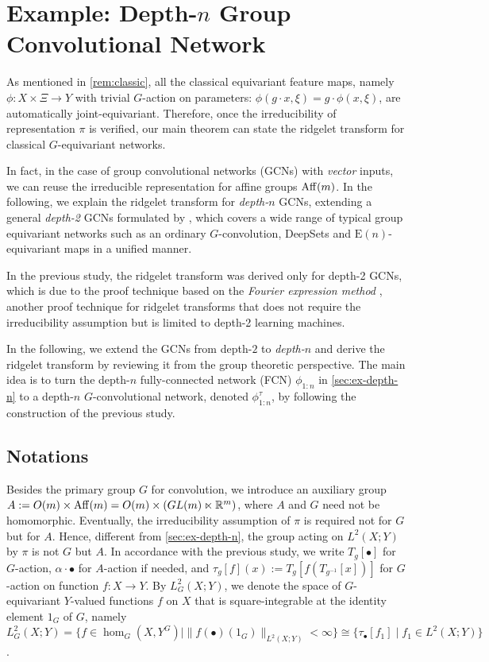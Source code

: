 \section{Example: Depth-$n$ Group Convolutional Network} \label{sec:gconv}
As mentioned in \cref{rem:classic}, all the classical equivariant feature maps, namely $\phi: X \times \Xi \to Y$ with trivial $G$-action on parameters: $\phi( g \cdot x, \xi) = g \cdot \phi(x,\xi)$, are automatically joint-equivariant.
Therefore, once the irreducibility of representation $\pi$ is verified, our main theorem can state the ridgelet transform for classical $G$-equivariant networks.

In fact, in the case of group convolutional networks (GCNs) with \emph{vector} inputs, we can reuse the irreducible representation for affine groups $\operatorname{Aff}(m)$.
In the following, we explain the ridgelet transform for \emph{depth-$n$} GCNs, extending a general \emph{depth-2} GCNs formulated by \citet{Sonoda2022gconv}, which
covers a wide range of typical group equivariant networks such as an ordinary $G$-convolution, DeepSets and $\mathrm{E}(n)$-equivariant maps in a unified manner.

In the previous study, the ridgelet transform was derived only for depth-2 GCNs, which is due to the proof technique based on the \emph{Fourier expression method} \citep[see][for more details]{Sonoda2024fourier}, another proof technique for ridgelet transforms that does not require the irreducibility assumption but is limited to depth-2 learning machines.

In the following, we extend the GCNs from depth-$2$ to \emph{depth-$n$} and derive the ridgelet transform by reviewing it from the group theoretic perspective.
The main idea is to turn the depth-$n$ fully-connected network (FCN) $\phi_{1:n}$ in \cref{sec:ex-depth-n} to a depth-$n$ $G$-convolutional network, denoted $\phi^\tau_{1:n}$, by following the construction of the previous study.

\subsection{Notations}
Besides the primary group $G$ for convolution, we introduce an auxiliary group $A := O(m) \times \operatorname{Aff}(m) = O(m) \times (GL(m) \ltimes \mathbb{R}^m)$, where $A$ and $G$ need not be homomorphic.
Eventually, the irreducibility assumption of $\pi$ is required not for $G$ but for $A$.
Hence, different from \cref{sec:ex-depth-n}, 
the group acting on $L^2(X;Y)$ by $\pi$ is not $G$ but $A$.
In accordance with the previous study, we write $T_g [\bullet]$ for $G$-action, $\alpha \cdot \bullet$ for $A$-action if needed, and $\tau_g[f](x) := T_g[f(T_{g^{-1}}[x])]$ for $G$-action on function $f:X\to Y$.
By $L^2_G(X;Y)$, we denote the space of $G$-equivariant $Y$-valued functions $f$ on $X$ that is square-integrable at the identity element $1_G$ of $G$, namely $L^2_G(X;Y) = \{ f \in \hom_G(X,Y^G) \mid \| f(\bullet)(1_G) \|_{L^2(X;Y)} < \infty\} \cong \{ \tau_\bullet[f_1] \mid f_1 \in L^2(X;Y)\}$.

